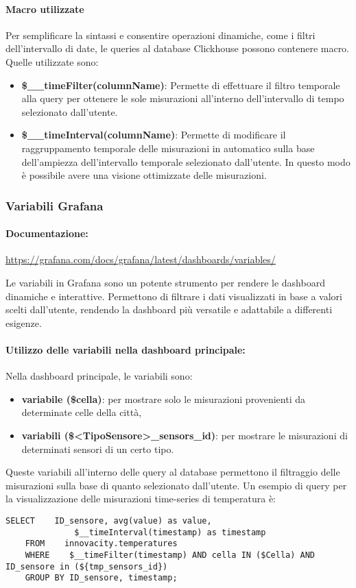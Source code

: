 \paragraph{Macro utilizzate}\label{sec:macros}
Per semplificare la sintassi e consentire operazioni dinamiche, come i filtri dell'intervallo di date, le queries al database Clickhouse possono contenere macro.
Quelle utilizzate sono:
\begin{itemize}
    \item \textbf{\$\_\_timeFilter(columnName)}: Permette di effettuare il filtro temporale alla query per ottenere le sole misurazioni all'interno dell'intervallo di tempo selezionato dall'utente.
    \item  \textbf{\$\_\_timeInterval(columnName)}: Permette di modificare il raggruppamento temporale delle misurazioni in automatico sulla base dell'ampiezza dell'intervallo temporale selezionato dall'utente.
    In questo modo è possibile avere una visione ottimizzate delle misurazioni.
\end{itemize}

\subsubsection{Variabili Grafana}
\paragraph*{Documentazione:}
 \href{https://grafana.com/docs/grafana/latest/dashboards/variables/}{https://grafana.com/docs/grafana/latest/dashboards/variables/}


 Le variabili in Grafana sono un potente strumento per rendere le dashboard dinamiche e interattive. Permettono di filtrare i dati visualizzati in base a valori scelti dall'utente, rendendo la dashboard più versatile e adattabile a differenti esigenze.
\paragraph*{Utilizzo delle variabili nella dashboard principale:}
Nella dashboard principale, le variabili sono:
\begin{itemize}
    \item \textbf{variabile (\$cella)}: per mostrare solo le misurazioni provenienti da determinate celle della città, 
    \item \textbf{variabili (\$<TipoSensore>\_sensors\_id)}: per mostrare le misurazioni di determinati sensori di un certo tipo.
\end{itemize}
Queste variabili all'interno delle query al database permettono il filtraggio delle misurazioni sulla base di quanto selezionato dall'utente.
Un esempio di query per la visualizzazione delle misurazioni time-series di temperatura è:
\begin{lstlisting}[style=code]
    SELECT    ID_sensore, avg(value) as value,
              $__timeInterval(timestamp) as timestamp
    FROM    innovacity.temperatures 
    WHERE    $__timeFilter(timestamp) AND cella IN ($Cella) AND ID_sensore in (${tmp_sensors_id})
    GROUP BY ID_sensore, timestamp;
\end{lstlisting}


